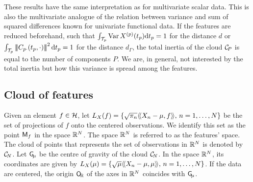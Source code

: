 \begin{remark}
    These results have the same interpretation as for multivariate scalar data. This is also the multivariate analogue of the relation between variance and sum of squared differences known for univariate functional data. If the features are reduced beforehand, such that $\int_{\mathcal{T}_{p}} \operatorname{Var}X^{(p)} (t_p) {\rm d} t_p = 1$ for the distance $d$ or $\int_{\mathcal{T}_{p}} \left|\!\left|\!\left|C_{p \cdot}(t_p, \cdot)\right|\!\right|\!\right|^2 {\rm d} t_p = 1$ for the distance $d_\Gamma$, the total inertia of the cloud $\mathcal{C}_{\!P}$ is equal to the number of components $P$. We are, in general, not interested by the total inertia but how this variance is spread among the features.
\end{remark}


\subsection{Cloud of features} %
\label{sub:cloud_of_features}

Given an element $f \in \mathcal{H}$, let $L_X(f) = \{\sqrt{\pi_n}\langle\!\langle X_n - \mu, f\rangle\!\rangle,\,n = 1, \dots, N\}$ be the set of projections of $f$ onto the centered observations. We identify this set as the point $\mathsf{M}_f$ in the space $\mathbb{R}^N$. The space $\mathbb{R}^N$ is referred to as the features' space. The cloud of points that represents the set of observations in $\mathbb{R}^N$ is denoted by $\mathcal{C}_{\!N}$. Let $\mathsf{G}_{\!\mu}$ be the centre of gravity of the cloud $\mathcal{C}_{\!N}$. In the space $\mathbb{R}^N$, its coordinates are given by $L_X(\mu) = \{\sqrt{\mu}\langle\!\langle X_n - \mu, \mu\rangle\!\rangle,\,n = 1, \dots, N\}$. If the data are centered, the origin $\mathsf{O}_{\!\mathbb{R}}$ of the axes in $\mathbb{R}^N$ coincides with $\mathsf{G}_{\!\mu}$.

